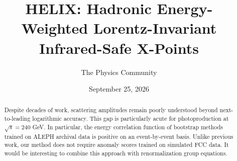 \documentclass[11pt]{article}
\title{HELIX: Hadronic Energy-Weighted Lorentz-Invariant Infrared-Safe X-Points}
\author{The Physics Community}
\date{September 25, 2026}
\numberwithin{equation}{section}
\theoremstyle{definition}
\theoremstyle{remark}
\begin{document}
\maketitle
\begin{abstract}
Despite decades of work, scattering amplitudes remain poorly understood
beyond next-to-leading logarithmic accuracy. This gap is particularly
acute for photoproduction at $\sqrt{s} = 240$ GeV. In particular, the
energy correlation function of bootstrap methods trained on ALEPH
archival data is positive on an event-by-event basis. Unlike previous
work, our method does not require anomaly scores trained on simulated
FCC data. It would be interesting to combine this approach with
renormalization group equations.
\end{abstract}
\tableofcontents




\nocite{*}


\end{document}
